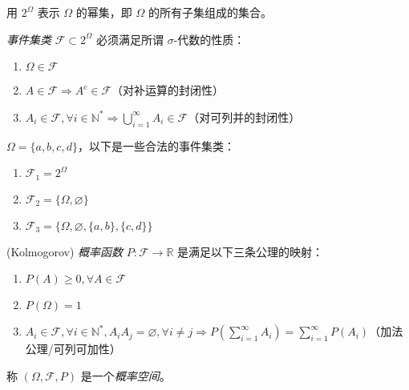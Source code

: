 \documentclass[../main.tex]{subfiles}
\begin{document}
用 $2^\Omega$ 表示 $\Omega$ 的幂集，即 $\Omega$ 的所有子集组成的集合。

\begin{definition}\label{def:1.5.1}
    \emph{事件集类} $\mathcal{F}\subset 2^\Omega$ 必须满足所谓 $\sigma$-代数的性质：
    \begin{enumerate}
        \item $\Omega\in\mathcal{F}$
        \item $A\in\mathcal{F}\Rightarrow A^c\in\mathcal{F}$（对补运算的封闭性）
        \item $A_i\in\mathcal{F},\forall i\in\mathbb{N}^*\Rightarrow \bigcup_{i=1}^\infty A_i\in\mathcal{F}$（对可列并的封闭性）
    \end{enumerate}
\end{definition}

\begin{example}
    $\Omega=\{a,b,c,d\}$，以下是一些合法的事件集类：
    \begin{enumerate}
        \item $\mathcal{F}_1=2^\Omega$
        \item $\mathcal{F}_2=\{\Omega,\varnothing\}$
        \item $\mathcal{F}_3=\{\Omega,\varnothing,\{a,b\},\{c,d\}\}$
    \end{enumerate}
\end{example}

\begin{definition}\label{def:1.5.2}
    (Kolmogorov) \emph{概率函数} $P:\mathcal{F}\rightarrow\mathbb{R}$ 是满足以下三条公理的映射：
    \begin{enumerate}
        \item $P(A)\geq 0,\forall A\in\mathcal{F}$
        \item $P(\Omega)=1$
        \item $A_i\in\mathcal{F},\forall i\in\mathbb{N}^*,A_iA_j=\varnothing,\forall i\neq j\Rightarrow P(\sum_{i=1}^\infty A_i)=\sum_{i=1}^\infty P(A_i)$（加法公理/可列可加性）
    \end{enumerate}
    称 $(\Omega,\mathcal{F},P)$ 是一个\emph{概率空间}。
\end{definition}
\end{document}
